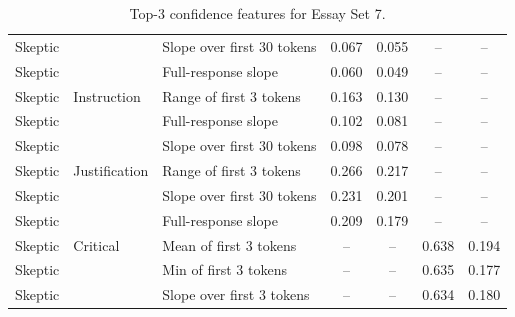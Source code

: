 \documentclass[11pt]{article}
\begin{document}
\begin{table}[t]
\begin{tabular}{l l l c c c c}
Skeptic  &               & Slope over first 30 tokens & 0.067 & 0.055 & -- & -- \\
Skeptic  &               & Full-response slope     & 0.060 & 0.049 & -- & -- \\
\midrule
Skeptic  & Instruction   & Range of first 3 tokens & 0.163 & 0.130 & -- & -- \\
Skeptic  &               & Full-response slope     & 0.102 & 0.081 & -- & -- \\
Skeptic  &               & Slope over first 30 tokens & 0.098 & 0.078 & -- & -- \\
\midrule
Skeptic  & Justification      & Range of first 3 tokens & 0.266 & 0.217 & -- & -- \\
Skeptic  &               & Slope over first 30 tokens & 0.231 & 0.201 & -- & -- \\
Skeptic  &               & Full-response slope     & 0.209 & 0.179 & -- & -- \\
\midrule
Skeptic  & Critical      & Mean of first 3 tokens  & -- & -- & 0.638 & 0.194 \\
Skeptic  &               & Min of first 3 tokens   & -- & -- & 0.635 & 0.177 \\
Skeptic  &               & Slope over first 3 tokens & -- & -- & 0.634 & 0.180 \\
\bottomrule
\end{tabular}
\caption{Top-3 confidence features for Essay Set 7.}
\label{tab:set7-top3}
\end{table}
\end{document}

